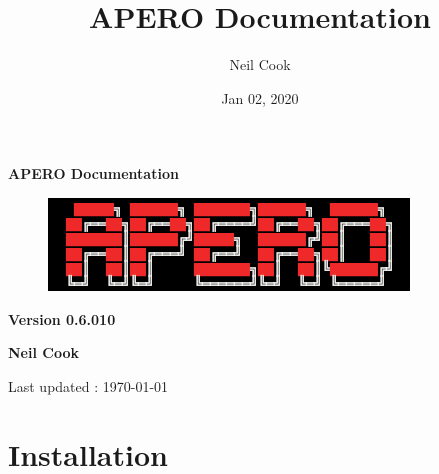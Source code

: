 \documentclass[a4paper,10pt,english]{report}
\title{APERO Documentation}
\date{Jan 02, 2020}
\author{Neil Cook}
\begin{document}
\pagestyle{empty}


        \begin{titlepage}
            \centering

            \vspace*{40mm} %
            \textbf{\Huge {APERO Documentation}}

            \vspace{5mm}
            \begin{figure}[!h]
                \centering
                \includegraphics[scale=1]{apero_logo.png}
            \end{figure}
            
            \vspace{5mm}
            \Large \textbf{Version 0.6.010}
            
            \vspace{5mm}
            \Large \textbf{{Neil Cook}}

            \vspace*{0mm}
            \small  Last updated : \MonthYearFormat\today


        \end{titlepage}

        \clearpage
        \tableofcontents

        
\pagestyle{plain}
 
\pagestyle{normal}
\label{\detokenize{index::doc}}



\chapter{Installation}
\label{\detokenize{user/installation:installation}}\label{\detokenize{user/installation:id1}}\label{\detokenize{user/installation::doc}}
\end{document}
